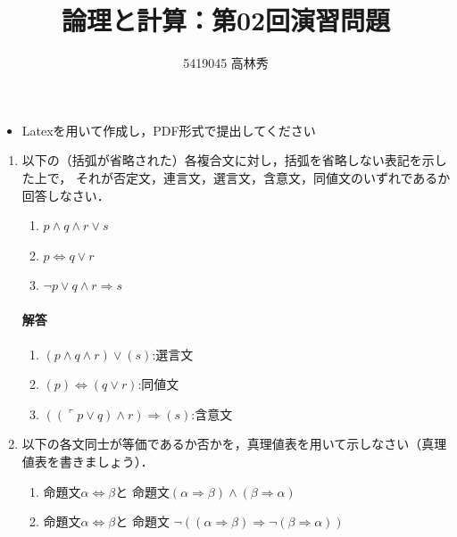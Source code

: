 \documentclass[dvipdfmx]{jsarticle}
\def\NO{02}
\def\LECTURENAME{論理と計算}
\begin{document}
\title{\LECTURENAME{}：第\NO{}回演習問題}

\author{5419045 高林秀}

\date{}
\maketitle

\begin{itemize}
\item Latexを用いて作成し，PDF形式で提出してください
\end{itemize}


\vspace*{\baselineskip}

\begin{enumerate}\setlength{\itemsep}{\baselineskip}
\item 以下の（括弧が省略された）各複合文に対し，括弧を省略しない表記を示した上で，
  それが否定文，連言文，選言文，含意文，同値文のいずれであるか回答しなさい．

  \begin{enumerate}
  \item $p \land q \land r \lor s$

  \item $p\Leftrightarrow q\lor r$

  \item $\neg p \lor q \land r \Rightarrow s$

  \end{enumerate}
  \paragraph{解答}
  \begin{enumerate}
    \item $(p \wedge q \wedge r) \vee (s)$:選言文
    \item $(p) \Leftrightarrow (q \vee r)$:同値文
    \item $((\ulcorner p \vee q) \wedge r) \Rightarrow (s)$:含意文
  \end{enumerate}


\item 以下の各文同士が等価であるか否かを，真理値表を用いて示しなさい（真理値表を書きましょう）．
  \begin{enumerate}
  \item
    命題文$\alpha\Leftrightarrow\beta$と
    命題文$(\alpha\Rightarrow\beta)\land (\beta\Rightarrow\alpha)$

  \item
    命題文$\alpha\Leftrightarrow\beta$と
    命題文
    $\neg((\alpha\Rightarrow\beta)\Rightarrow\neg(\beta\Rightarrow\alpha))$


\end{enumerate}
\end{enumerate}
\end{document}
